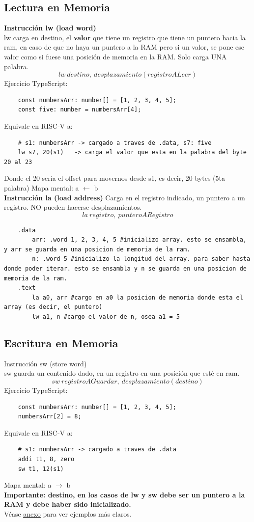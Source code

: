 \documentclass[10pt,a4paper]{article}
\begin{document}
\subsection*{Lectura en Memoria} 
\textbf{Instrucción lw (load word)} \\ 
lw carga en destino, el \textbf{valor} que tiene un registro que tiene un puntero hacia la ram, en caso de que no haya un puntero a la RAM pero si un valor, se pone ese valor como si fuese una posición de memoria en la RAM. Solo carga UNA palabra. \\ 
\[lw \ destino, \ desplazamiento(registroALeer)\]
Ejercicio TypeScript: 
\begin{lstlisting}
    const numbersArr: number[] = [1, 2, 3, 4, 5];
    const five: number = numbersArr[4];
\end{lstlisting}
Equivale en RISC-V a:
\begin{lstlisting}
    # s1: numbersArr -> cargado a traves de .data, s7: five
    lw s7, 20(s1)   -> carga el valor que esta en la palabra del byte 20 al 23
\end{lstlisting}
Donde el 20 sería el offset para movernos desde s1, es decir, 20 bytes (5ta palabra) 
Mapa mental: a \( \leftarrow \) b \\
\textbf{Instrucción la (load address)}
Carga en el registro indicado, un puntero a un registro. NO pueden hacerse desplazamientos.
\[la \ registro, \ punteroARegistro\]
\begin{lstlisting}
    .data
        arr: .word 1, 2, 3, 4, 5 #inicializo array. esto se ensambla, y arr se guarda en una posicion de memoria de la ram.
        n: .word 5 #inicializo la longitud del array. para saber hasta donde poder iterar. esto se ensambla y n se guarda en una posicion de memoria de la ram.
    .text
        la a0, arr #cargo en a0 la posicion de memoria donde esta el array (es decir, el puntero)
        lw a1, n #cargo el valor de n, osea a1 = 5
\end{lstlisting}
\subsection*{Escritura en Memoria} 
Instrucción sw (store word) \\
sw guarda un contenido dado, en un registro en una posición que esté en ram.
\[sw \ registroAGuardar, \ desplazamiento(destino)\] 
Ejercicio TypeScript: 
\begin{lstlisting}
    const numbersArr: number[] = [1, 2, 3, 4, 5];
    numbersArr[2] = 8; 
\end{lstlisting}
Equivale en RISC-V a:
\begin{lstlisting}
    # s1: numbersArr -> cargado a traves de .data
    addi t1, 8, zero
    sw t1, 12(s1)   
\end{lstlisting}
Mapa mental: a \( \rightarrow \) b \\
\textbf{Importante: destino, en los casos de lw y sw debe ser un puntero a la RAM y debe haber sido inicializado.} \\
Véase \hyperref[subsec:punteros_ram_registros]{\underline{anexo}} para ver ejemplos más claros. 
\end{document}

